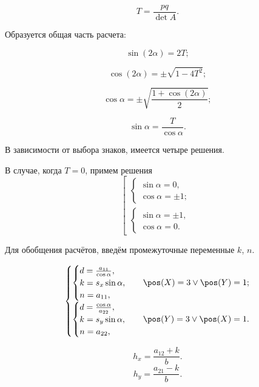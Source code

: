 $$T = \frac{pq}{\det A}.$$

Образуется общая часть расчета:

$$\sin(2\alpha) = 2T;$$

$$\cos(2\alpha) = \pm \sqrt{1-4T^2};$$

$$\cos\alpha = \pm \sqrt{\frac{1 + \cos(2\alpha)}{2}};$$

$$\sin\alpha = \frac{T}{\cos\alpha}.$$

В зависимости от выбора знаков, имеется четыре решения.

В случае, когда $T=0$, примем решения
$$\left[ \begin{gathered}
\begin{cases}
	\sin\alpha = 0,\\
	\cos\alpha = \pm 1;
\end{cases}\\
\begin{cases}
	\sin\alpha = \pm 1,\\
	\cos\alpha = 0.
\end{cases}
\end{gathered}\right.$$

Для обобщения расчётов, введём промежуточные переменные $k$, $n$.

$$\begin{cases}
	\begin{cases}
		d = \frac{a_{11}}{\cos\alpha},\\
		k = s_x \sin\alpha,\\
		n = a_{11},\\
	\end{cases} & \pos(X)=3 \vee \pos(Y)=1;\\
	\begin{cases}
		d = \frac{\cos\alpha}{a_{22}},\\
		k = s_y \sin\alpha,\\
		n = a_{22},
	\end{cases} & \pos(Y)=3 \vee \pos(X) = 1.
\end{cases}$$


$$h_x = \frac{a_{12} + k}{b}.$$
$$h_y = \frac{a_{21} - k}{b}.$$

